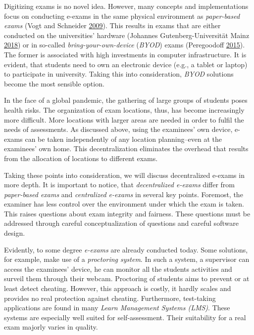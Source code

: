Digitizing exams is no novel idea. However, many concepts and
implementations focus on conducting e-exams in the same physical
environment as \emph{paper-based exams} (Vogt and Schneider
\protect\hyperlink{ref-Vogt2009}{2009}). This results in exams that are
either conducted on the universities' hardware (Johannes
Gutenberg-Universität Mainz
\protect\hyperlink{ref-JohannesGutenberg-UniversitatMainz}{2018}) or in
so-called \emph{bring-your-own-device} (\emph{BYOD}) exams (Peregoodoff
\protect\hyperlink{ref-GLM2015}{2015}). The former is associated with
high investments in computer infrastructure. It is evident, that
students need to own an electronic device (e.g., a tablet or laptop) to
participate in university. Taking this into consideration, \emph{BYOD}
solutions become the most sensible option.

In the face of a global pandemic, the gathering of large groups of
students poses health risks. The organization of exam locations, thus,
has become increasingly more difficult. More locations with larger areas
are needed in order to fulfil the needs of assessments. As discussed
above, using the examinees' own device, e-exams can be taken
independently of any location planning--even at the examinees' own home.
This decentralization eliminates the overhead that results from the
allocation of locations to different exams.

Taking these points into consideration, we will discuss decentralized
e-exams in more depth. It is important to notice, that
\emph{decentralized e-exams} differ from \emph{paper-based exams} and
\emph{centralized e-exams} in several key points. Foremost, the examiner
has less control over the environment under which the exam is taken.
This raises questions about exam integrity and fairness. These questions
must be addressed through careful conceptualization of questions and
careful software design.

Evidently, to some degree \emph{e-exams} are already conducted today.
Some solutions, for example, make use of a \emph{proctoring system}. In
such a system, a supervisor can access the examinees' device, he can
monitor all the students activities and surveil them through their
webcam. Proctoring of students aims to prevent or at least detect
cheating. However, this approach is costly, it hardly scales and
provides no real protection against cheating. Furthermore, test-taking
applications are found in many \emph{Learn Management Systems (LMS)}.
These systems are especially well suited for self-assessment. Their
suitability for a real exam majorly varies in quality.

